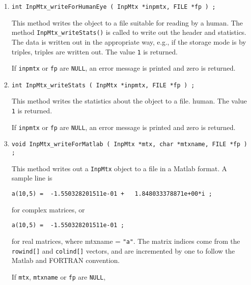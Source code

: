 \begin{enumerate}
\item
\begin{verbatim}
int InpMtx_writeForHumanEye ( InpMtx *inpmtx, FILE *fp ) ;
\end{verbatim}
\par
This method writes the object to a file suitable for reading by a
human.
The method {\tt InpMtx\_writeStats()} is called to write out the
header and statistics. 
The data is written out in the appropriate way, e.g., if the
storage mode is by triples, triples are written out.
The value {\tt 1} is returned.
\par {}
If {\tt inpmtx} or {\tt fp} are {\tt NULL}, 
an error message is printed and zero is returned.
\item
\begin{verbatim}
int InpMtx_writeStats ( InpMtx *inpmtx, FILE *fp ) ;
\end{verbatim}
\par
This method writes the statistics about the object to a file.
human.
The value {\tt 1} is returned.
\par {}
If {\tt inpmtx} or {\tt fp} are {\tt NULL},
 an error message is printed and zero is returned.
\item
\begin{verbatim}
void InpMtx_writeForMatlab ( InpMtx *mtx, char *mtxname, FILE *fp ) ;
\end{verbatim}
\par
This method writes out a {\tt InpMtx} object to a file in a Matlab
format.
A sample line is
\begin{verbatim}
a(10,5) =  -1.550328201511e-01 +   1.848033378871e+00*i ;
\end{verbatim}
for complex matrices, or
\begin{verbatim}
a(10,5) =  -1.550328201511e-01 ;
\end{verbatim}
for real matrices, where mtxname = {\tt "a"}.
The matrix indices come from the {\tt rowind[]} and {\tt colind[]}
vectors, and are incremented by one to follow the Matlab and
FORTRAN convention.
\par {}
If {\tt mtx}, {\tt mtxname} or {\tt fp} are {\tt NULL},

\end{enumerate}

